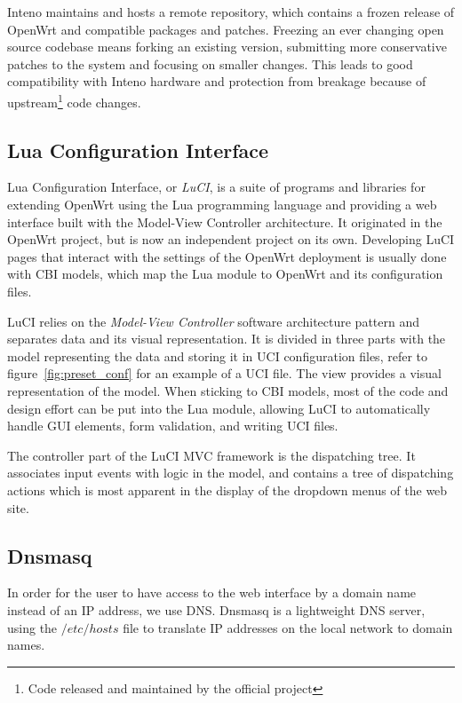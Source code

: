 \documentclass[a4paper,11pt,makeidx]{kth-bcs}
\begin{document}
Inteno maintains and hosts a remote repository, which contains a frozen release of OpenWrt and compatible packages and patches.
Freezing an ever changing open source codebase means forking an existing version, submitting more conservative patches to the system and focusing on smaller changes.
This leads to good compatibility with Inteno hardware and protection from breakage because of upstream\footnote{Code released and maintained by the official project} code changes.

\subsection{Lua Configuration Interface}\label{sec:LuCI}
Lua Configuration Interface, or \emph{LuCI}, is a suite of programs and libraries for extending OpenWrt using the Lua programming language and providing a web interface built with the Model-View Controller architecture.
It originated in the OpenWrt project, but is now an independent project on its own.
Developing LuCI pages that interact with the settings of the OpenWrt deployment is usually done with CBI models, which map the Lua module to OpenWrt and its configuration files.

LuCI relies on the \emph{Model-View Controller} software architecture pattern and separates data and its visual representation.
It is divided in three parts with the model representing the data and storing it in UCI configuration files, refer to figure~\ref{fig:preset_conf} for an example of a UCI file.
The view provides a visual representation of the model.
When sticking to CBI models, most of the code and design effort can be put into the Lua module, allowing LuCI to automatically handle GUI elements, form validation, and writing UCI files.

The controller part of the LuCI MVC framework is the dispatching tree.
It associates input events with logic in the model, and contains a tree of dispatching actions which is most apparent in the display of the dropdown menus of the web site.

\subsection{Dnsmasq}
In order for the user to have access to the web interface by a domain name instead of an IP address, we use DNS.
Dnsmasq is a lightweight DNS server, using the $/etc/hosts$ file to translate IP addresses on the local network to domain names.\cite{dnsmasq}
\end{document}
